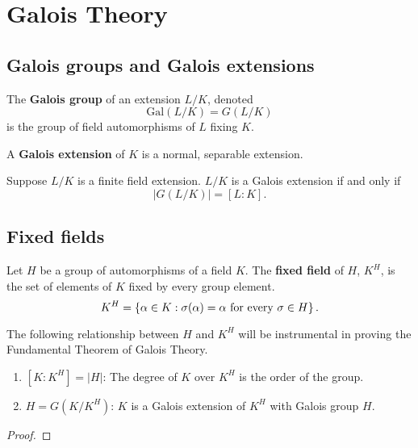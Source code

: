 \chapter{Galois Theory}\label{galois}
\section{Galois groups and Galois extensions}
\begin{df}
The \textbf{Galois group} of an extension $L/K$, denoted 
\[
\text{Gal}(L/K)=G(L/K)
\]
is the group of field automorphisms of $L$ fixing $K$. 
\end{df}
\begin{df}
A \textbf{Galois extension} of $K$ is a normal, separable extension.
\end{df}
\begin{thm}\label{galois-extension-order}
Suppose $L/K$ is a finite field extension. $L/K$ is a Galois extension if and only if
\[
|G(L/K)|=[L:K].
\]
\end{thm}
\section{Fixed fields}
\begin{df}
Let $H$ be a group of automorphisms of a field $K$. The \textbf{fixed field} of $H$, $K^H$, is the set of elements of $K$ fixed by every group element.
\[
K^H=\left\{{\alpha\in K}:{\sigma(\alpha)=\alpha\text{ for every }\sigma\in H}\right\}.
\]
\end{df}
The following relationship between $H$ and $K^H$ will be instrumental in proving the Fundamental Theorem of Galois Theory. 
\begin{thm}\label{fixed-field}
\begin{enumerate}
\item $[K:K^H]=|H|$: The degree of $K$ over $K^H$ is the order of the group.
\item $H=G(K/K^H)$: $K$ is a Galois extension of $K^H$ with Galois group $H$.
\end{enumerate}
\end{thm}
\begin{proof}
%
\end{proof}
